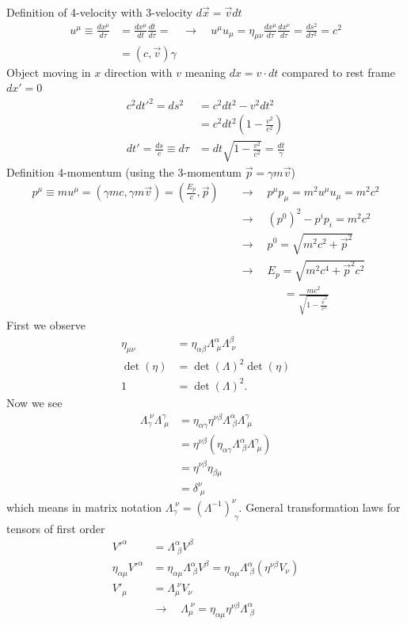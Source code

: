 \documentclass[10pt,a4paper]{article}
\theoremstyle{definition}
\begin{document}
Definition of 4-velocity with 3-velocity $d\vec{x} = \vec{v} dt$
\begin{align}
    u^\mu\equiv\frac{dx^\mu}{d\tau}&=\frac{dx^\mu}{dt}\frac{dt}{d\tau}=\quad\rightarrow\quad u^\mu u_\mu=\eta_{\mu\nu}\frac{dx^\mu}{d\tau} \frac{dx^\nu}{d\tau}=\frac{ds^2}{d\tau^2}=c^2\\
    &=(c,\vec{v})\gamma
\end{align}
Object moving in $x$ direction with $v$ meaning $dx=v\cdot dt$ compared to
rest frame $dx'=0$
\begin{align}
    c^2dt'^2=ds^2 &= c^2dt^2- v^2 dt^2\\
    &=c^2dt^2\left(1-\frac{v^2}{c^2}\right)\\
    dt'=\frac{ds}{c}\equiv d\tau&=dt\sqrt{1-\frac{v^2}{c^2}}=\frac{dt}{\gamma}
\end{align}
Definition 4-momentum (using the 3-momentum $\vec{p}=\gamma m\vec{v}$)
\begin{align}
    p^\mu \equiv mu^\mu=(\gamma mc,\gamma m\vec{v})=\left(\frac{E_p}{c},\vec{p}\right)\quad&\rightarrow\quad p^\mu p _\mu=m^2u^\mu u_\mu=m^2c^2\\
    &\rightarrow\quad (p^0)^2-p^ip_i=m^2c^2\\
    &\rightarrow\quad p^0=\sqrt{m^2c^2+\vec{p}^2}\\
    &\rightarrow\quad E_p=\sqrt{m^2c^4+\vec{p}^2c^2}\\
    &\qquad\qquad=\frac{mc^2}{\sqrt{1-\frac{\vec{v}^2}{c^2}}}
\end{align}
First we observe
\begin{align}
    \eta_{\mu\nu} &= \eta_{\alpha\beta}\Lambda^\alpha_{\;\mu} \Lambda^\beta_{\;\nu}\\
    \det(\eta)&=\det(\Lambda)^2\det(\eta)\\
    1&=\det(\Lambda)^2.
\end{align}
Now we see
\begin{align}
    \Lambda_\gamma^{\;\nu}\Lambda^\gamma_{\;\mu}&=\eta_{\alpha\gamma}\eta^{\nu\beta}\Lambda^\alpha_{\;\beta} \Lambda^\gamma_{\;\mu}\\
    &=\eta^{\nu\beta}(\eta_{\alpha\gamma}\Lambda^\alpha_{\;\beta} \Lambda^\gamma_{\;\mu})\\
    &=\eta^{\nu\beta}\eta_{\beta\mu}\\
    &=\delta^\nu_{\;\mu}
\end{align}
which means in matrix notation $\Lambda_\gamma^{\;\nu}=(\Lambda^{-1})^\nu_{\;\gamma}$.
General transformation laws for tensors of first order
\begin{align}
    V'^\alpha&=\Lambda^\alpha_{\;\beta}V^\beta\\
    \eta_{\alpha\mu}V'^\alpha&=\eta_{\alpha\mu}\Lambda^\alpha_{\;\beta}V^\beta=\eta_{\alpha\mu}\Lambda^\alpha_{\;\beta}(\eta^{\nu\beta}V_\nu)\\
    V'_\mu&=\Lambda_\mu^{\;\nu}V_\nu\\
    &\rightarrow\quad \Lambda_\mu^{\;\nu} = \eta_{\alpha\mu}\eta^{\nu\beta}\Lambda^\alpha_{\;\beta}
\end{align}
\end{document}

